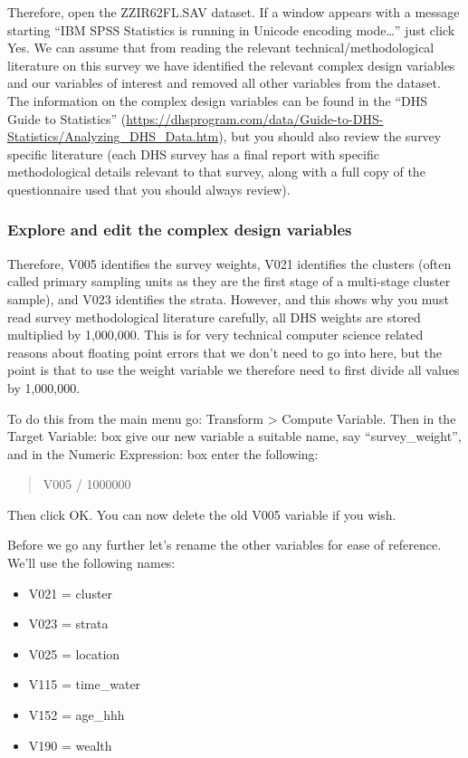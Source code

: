 \documentclass[
]{book}
\begin{document}
Therefore, open the ZZIR62FL.SAV dataset. If a window appears with a message starting ``IBM SPSS Statistics is running in Unicode encoding mode\ldots{}'' just click Yes. We can assume that from reading the relevant technical/methodological literature on this survey we have identified the relevant complex design variables and our variables of interest and removed all other variables from the dataset. The information on the complex design variables can be found in the ``DHS Guide to Statistics'' (\url{https://dhsprogram.com/data/Guide-to-DHS-Statistics/Analyzing_DHS_Data.htm}), but you should also review the survey specific literature (each DHS survey has a final report with specific methodological details relevant to that survey, along with a full copy of the questionnaire used that you should always review).

\hypertarget{explore-and-edit-the-complex-design-variables}{%
\subsubsection{Explore and edit the complex design variables}\label{explore-and-edit-the-complex-design-variables}}

Therefore, V005 identifies the survey weights, V021 identifies the clusters (often called primary sampling units as they are the first stage of a multi-stage cluster sample), and V023 identifies the strata. However, and this shows why you must read survey methodological literature carefully, all DHS weights are stored multiplied by 1,000,000. This is for very technical computer science related reasons about floating point errors that we don't need to go into here, but the point is that to use the weight variable we therefore need to first divide all values by 1,000,000.

To do this from the main menu go: Transform \textgreater{} Compute Variable. Then in the Target Variable: box give our new variable a suitable name, say ``survey\_weight'', and in the Numeric Expression: box enter the following:

\begin{quote}
V005 / 1000000
\end{quote}

Then click OK. You can now delete the old V005 variable if you wish.

Before we go any further let's rename the other variables for ease of reference. We'll use the following names:

\begin{itemize}
\item
  V021 = cluster
\item
  V023 = strata
\item
  V025 = location
\item
  V115 = time\_water
\item
  V152 = age\_hhh
\item
  V190 = wealth
\end{itemize}
\end{document}
